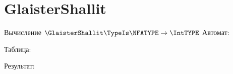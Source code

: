 \section{GlaisterShallit}
\begin{frame}{Вычисление $\GlaisterShallit\TypeIs\NFATYPE\to\IntTYPE$}
	Автомат:


	Таблица:


	Результат:


\end{frame}
